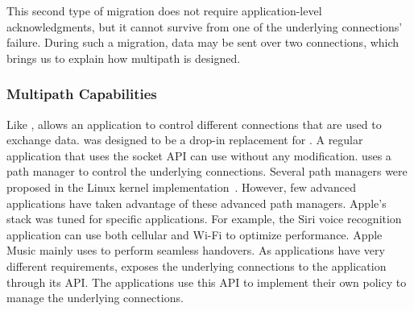 
This second type of migration does not require application-level
acknowledgments, but it cannot survive from one of the underlying connections'
failure. During such a migration, data may be sent over two connections, which
brings us to explain how multipath is designed.

\subsubsection{Multipath Capabilities}\label{sec:multipath}

Like \mptcp, \tcpls allows an application to control different \tcp connections
that are used to exchange data. \mptcp was designed to be a drop-in replacement
for \tcp. A regular application that uses the socket API can use \mptcp without
any modification. \mptcp uses a path manager to control the underlying \tcp
connections. Several path managers were proposed in the Linux kernel
implementation~\cite{boccassi-binder, hesmans2015smapp, hesmans2016enhanced}.
However, few advanced applications have taken advantage of these advanced path managers. Apple's \mptcp stack was tuned for specific applications. For example, the Siri voice recognition application can use both cellular and Wi-Fi to optimize performance. Apple Music mainly uses \mptcp to perform seamless handovers. As applications have very different requirements, \tcpls exposes the underlying \tcp connections to the application through its API. The applications use this API to implement their own policy to manage the underlying \tcp connections.

